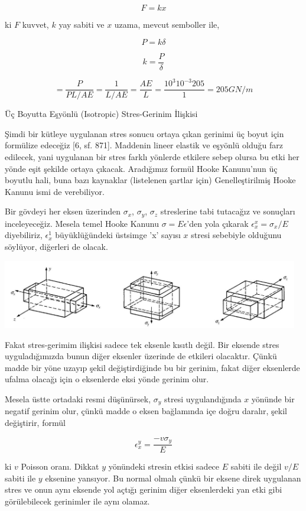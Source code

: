 \documentclass[12pt,fleqn]{article}\usepackage{../../common}
\begin{document}
$$
F = k x
$$

ki $F$ kuvvet, $k$ yay sabiti ve $x$ uzama, mevcut semboller ile,

$$
P = k \delta
$$

$$
k = \frac{P}{\delta}
$$

$$
= \frac{P}{PL / AE} = \frac{1}{L / AE} = \frac{AE}{L} =
\frac{10^3 10^{-3} 205}{1} =
205 GN/m
$$


Üç Boyutta Eşyönlü (Isotropic) Stres-Gerinim İlişkisi 

Şimdi bir kütleye uygulanan stres sonucu ortaya çıkan gerinimi üç boyut için
formülize edeceğiz [6, sf. 871]. Maddenin lineer elastik ve eşyönlü olduğu farz
edilecek, yani uygulanan bir stres farklı yönlerde etkilere sebep olursa bu etki
her yönde eşit şekilde ortaya çıkacak. Aradığımız formül Hooke Kanunu'nun üç
boyutlu hali, buna bazı kaynaklar (listelenen şartlar için) Genelleştirilmiş
Hooke Kanunu ismi de verebiliyor.

Bir gövdeyi her eksen üzerinden $\sigma_x$, $\sigma_y$, $\sigma_z$ streslerine
tabi tutacağız ve sonuçları inceleyeceğiz. Mesela temel Hooke Kanunu $\sigma = E
\epsilon$'den yola çıkarak $\epsilon_x^x = \sigma_x / E$ diyebiliriz,
$\epsilon_x^1$ büyüklüğündeki üstsimge 'x' sayısı $x$ stresi sebebiyle
olduğunu söylüyor, diğerleri de olacak.

\includegraphics[width=35em]{phy_020_strs_00_10.jpg}

Fakat stres-gerimim ilişkisi sadece tek eksenle kısıtlı değil. Bir eksende stres
uyguladığımızda bunun diğer eksenler üzerinde de etkileri olacaktır.  Çünkü
madde bir yöne uzayıp şekil değiştirdiğinde bu bir gerinim, fakat diğer
eksenlerde ufalma olacağı için o eksenlerde eksi yönde gerinim olur.

Mesela üstte ortadaki resmi düşünürsek, $\sigma_y$ stresi uygulandığında $x$
yönünde bir negatif gerinim olur, çünkü madde o eksen bağlamında içe doğru
daralır, şekil değiştirir, formül

$$
\epsilon_x^y =  \frac{- v \sigma_y}{E}
$$

ki $v$ Poisson oranı. Dikkat $y$ yönündeki stresin etkisi sadece $E$ sabiti ile
değil $v/E$ sabiti ile $y$ eksenine yansıyor. Bu normal olmalı çünkü bir eksene
direk uygulanan stres ve onun aynı eksende yol açtığı gerinim diğer eksenlerdeki
yan etki gibi görülebilecek gerinimler ile aynı olamaz.
\end{document}
